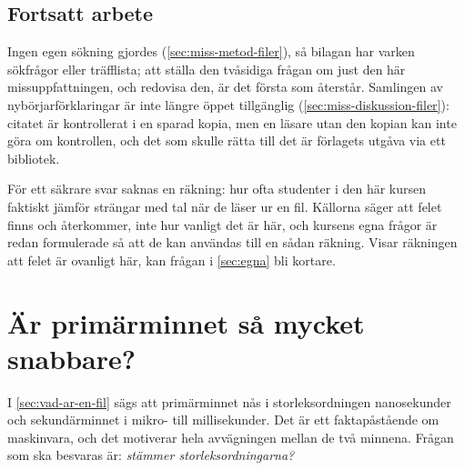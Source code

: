 \section{Fortsatt arbete}
\label{sec:miss-fortsatt-filer}

Ingen egen sökning gjordes (\cref{sec:miss-metod-filer}), så bilagan har
varken sökfrågor eller träfflista; att ställa den tvåsidiga frågan om
just den här missuppfattningen, och redovisa den, är det första som
återstår.    Samlingen av
nybörjarförklaringar är inte längre öppet tillgänglig
(\cref{sec:miss-diskussion-filer}): citatet är kontrollerat i en sparad
kopia, men en läsare utan den kopian kan inte göra om kontrollen, och
det som skulle rätta till det är förlagets utgåva via ett bibliotek.%

För ett säkrare svar saknas en räkning: hur ofta studenter i den här kursen faktiskt
jämför strängar med tal när de läser ur en fil.  Källorna säger att felet finns och
återkommer, inte hur vanligt det är här, och kursens egna frågor är
redan formulerade så att de kan användas till en sådan räkning.%
Visar räkningen att felet är
ovanligt här, kan frågan i \cref{sec:egna} bli kortare.


\chapter{Är primärminnet så mycket snabbare?}
\label{app:minne}

I \cref{sec:vad-ar-en-fil} sägs att primärminnet nås i storleksordningen
nanosekunder och sekundärminnet i mikro- till millisekunder.  Det är ett
faktapåstående om maskinvara, och det motiverar hela avvägningen mellan
de två minnena.  Frågan som ska besvaras är: \emph{stämmer
storleksordningarna?}

